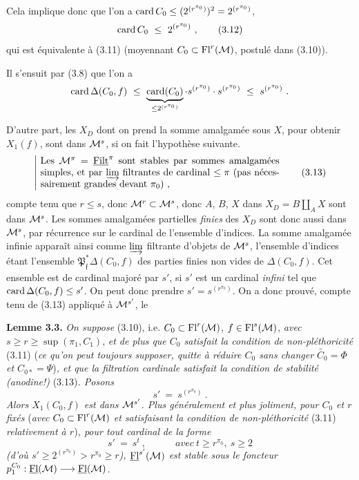  Cela implique donc que l'on a $\operatorname{card} C_0\leq(2^{(r^{\pi_0})})^2=2^{(r^{\pi_0})}$,
\[
\operatorname{card} C_0\ \leq\ 2^{(r^{\pi_0})}\ , \tag*{(3.12)}
\]
qui est équivalente à (3.11) (moyennant $C_0\subset\mathrm{Fl}^r(\mathcal{M})$, postulé dans (3.10)).

Il s'ensuit par (3.8) que l'on a
\[
\card\Delta(C_0,f)\ \leq\ \underbrace{\card(C_0)}_{\leq 2^{(r^{\pi_0})}}\cdot s^{(r^{\pi_0})}\cdot s^{(r^{\pi_0})}\ \leq\ s^{(r^{\pi_0})}\ .
\]

D'autre part, les $X_D$ dont on prend la somme amalgamée sous $X$, pour obtenir $X_1(f)$, sont dans $\mathcal{M}^s$, si on fait l'hypothèse suivante. 
\[
\left|\ \parbox{0.72\linewidth}{Les $\M^\pi=\uFilt^\pi$ sont stables par sommes amalgamées simples, et par $\varinjlim$ filtrantes de cardinal $\leq\pi$ (pas nécessairement grandes devant $\pi_0$) ,}\right. \tag*{(3.13)}
\]
compte tenu que $r\leq s$, donc $\mathcal{M}^r\subset\mathcal{M}^s$, donc $A$, $B$, $X$ dans $X_D=B\amalg_A X$ sont dans $\mathcal{M}^s$. Les sommes amalgamées partielles \textit{finies} des $X_D$ sont donc aussi dans $\mathcal{M}^s$, par récurrence sur le cardinal de l'ensemble d'indices. La somme amalgamée infinie apparaît ainsi comme $\varinjlim$ filtrante d'objets de $\mathcal{M}^s$, l'ensemble d'indices étant l'ensemble $\mathfrak{P}^*_{\mathfrak{f}}\Delta(C_0,f)$ des parties finies non vides de $\Delta(C_0,f)$. Cet ensemble est de cardinal majoré par $s'$, si $s'$ est un cardinal \textit{infini} tel que $\operatorname{card}\Delta(C_0,f)\leq s'$. On peut donc prendre $s'=s^{(r^{\pi_0})}$. On a donc prouvé, compte tenu de (3.13) appliqué à $\mathcal{M}^{s'}$, le %

\textbf{Lemme 3.3.} \textit{On suppose} \textup{(3.10), i.e.} $C_0\subset\mathrm{Fl}^r(\mathcal{M})$, $f\in\mathrm{Fl}^s(\mathcal{M})$, \textit{avec} $s\geq r\geq\sup(\pi_1,C_1)$, \textit{et de plus que $C_0$ satisfait la condition de non-pléthoricité} \textup{(3.11)} \textup{(}\textit{ce qu'on peut toujours supposer, quitte à réduire $C_0$ sans changer $\widetilde{C_0}=\Phi$ et $C_{0*}=\Psi$}\textup{)}\textit{, et que la filtration cardinale satisfait la condition de stabilité (anodine!)} \textup{(3.13)}\textit{. Posons}
\[
s'\ =\ s^{(r^{\pi_0})}\ . \tag*{(3.14)}
\]
\textit{Alors $X_1(C_0,f)$ est dans $\mathcal{M}^{s'}$. Plus généralement et plus joliment, pour $C_0$ et $r$ fixés} \textup{(}\textit{avec $C_0\subset\mathrm{Fl}^r(\mathcal{M})$ et satisfaisant la condition de non-pléthoricité} \textup{(3.11)} \textit{relativement à $r$}\textup{)}\textit{, pour tout cardinal}  \textit{de la forme}
\[
s'\ =\ s^t\ ,\qquad\quad\textit{avec}\ t\geq r^{\pi_0},\ s\geq 2 \tag*{(3.15)}
\]
\textit{(d'où $s'\geq 2^{(r^{\pi_0})}>r^{\pi_0}\geq r$), $\underline{\mathrm{Fl}}^{s'}(\mathcal{M})$ est stable sous le foncteur $p_1^{C_0}:\underline{\mathrm{Fl}}(\mathcal{M})\longrightarrow\underline{\mathrm{Fl}}(\mathcal{M})$.}

